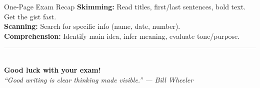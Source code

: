 \documentclass[12pt,a4paper]{article}
\begin{document}
\begin{keybox}{One-Page Exam Recap}
\vspace{0.2cm}
\textbf{Skimming:} Read titles, first/last sentences, bold text. Get the gist fast.\\
\textbf{Scanning:} Search for specific info (name, date, number).\\
\textbf{Comprehension:} Identify main idea, infer meaning, evaluate tone/purpose.
\end{keybox}

\vfill
\begin{center}
\rule{0.5\textwidth}{1pt}\\[0.3cm]
{\large\textcolor{primary}{\textbf{Good luck with your exam!}}}\\[0.2cm]
{\small\textit{``Good writing is clear thinking made visible.'' --- Bill Wheeler}}
\end{center}
\end{document}
